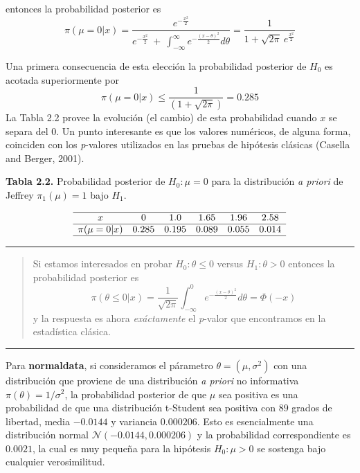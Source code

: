 \documentclass[12pt,]{article}
\begin{document}
entonces la probabilidad posterior es \[
\pi(\mu=0|x)=  \frac{\displaystyle e^{-\frac{x^2}{2}}}{e^{-\frac{x^2}{2}}\ +\ \displaystyle \int_{-\infty}^{\infty}e^{-\frac{(x-\theta)^2}{2}}d\theta}=\frac{1}{1+\sqrt{2\pi}\ e^{\frac{x^2}{2}}}
\]

Una primera consecuencia de esta elección la probabilidad posterior de
\(H_0\) es acotada superiormente por \[
\pi(\mu=0|x)\le\frac{1}{(1+\sqrt{2\pi})}=0.285
\] La Tabla 2.2 provee la evolución (el cambio) de esta probabilidad
cuando \(x\) se separa del \(0\). Un punto interesante es que los
valores numéricos, de alguna forma, coinciden con los \emph{p}-valores
utilizados en las pruebas de hipótesis clásicas (Casella and Berger,
2001).

\textbf{Tabla 2.2.} Probabilidad posterior de \(H_0:\mu=0\) para la
distribución \emph{a priori} de Jeffrey \(\pi_1(\mu)=1\) bajo \(H_1\).

\[
\begin{array}{cccccc}
\hline
x              & 0     & 1.0   & 1.65  & 1.96  & 2.58  \\ \hline
\pi(\mu=0|x)   & 0.285 & 0.195 & 0.089 & 0.055 & 0.014 \\ \hline
\end{array}
\]

\begin{center}\rule{0.5\linewidth}{\linethickness}\end{center}

\begin{quote}
Si estamos interesados en probar \(H_0: \theta\le 0\) versus
\(H_1:\theta>0\) entonces la probabilidad posterior es \[
\pi(\theta\le 0|x)=\frac{1}{\sqrt{2\pi}}\int_{-\infty}^0 e^{-\frac{(x-\theta)^2}{2}}d\theta=\Phi(-x)
\] y la respuesta es ahora \emph{exáctamente} el \emph{p}-valor que
encontramos en la estadística clásica.
\end{quote}

\begin{center}\rule{0.5\linewidth}{\linethickness}\end{center}

Para \textbf{normaldata}, si consideramos el párametro
\(\theta=(\mu,\sigma^2)\) con una distribución que proviene de una
distribución \emph{a priori} no informativa \(\pi(\theta)=1/\sigma^2\),
la probabilidad posterior de que \(\mu\) sea positiva es una
probabilidad de que una distribución t-Student sea positiva con \(89\)
grados de libertad, media \(-0.0144\) y variancia \(0.000206\). Esto es
esencialmente una distribución normal \(\mathcal{N}(-0.0144,0.000206)\)
y la probabilidad correspondiente es \(0.0021\), la cual es muy pequeña
para la hipótesis \(H_0:\mu>0\) se sostenga bajo cualquier
verosimilitud.
\end{document}
